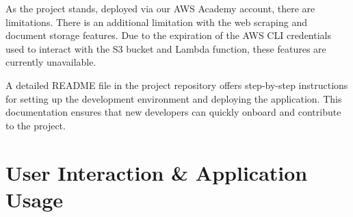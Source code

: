 \documentclass[a4paper, 11pt]{article}
\begin{document}
As the project stands, deployed via our AWS Academy account, there are limitations. There is an additional limitation with the web scraping and document storage features. Due to the expiration of the AWS CLI credentials used to interact with the S3 bucket and Lambda function, these features are currently unavailable.

A detailed README file in the project repository offers step-by-step instructions for setting up the development environment and deploying the application. This documentation ensures that new developers can quickly onboard and contribute to the project.








\section{User Interaction \& Application Usage}
\end{document}
